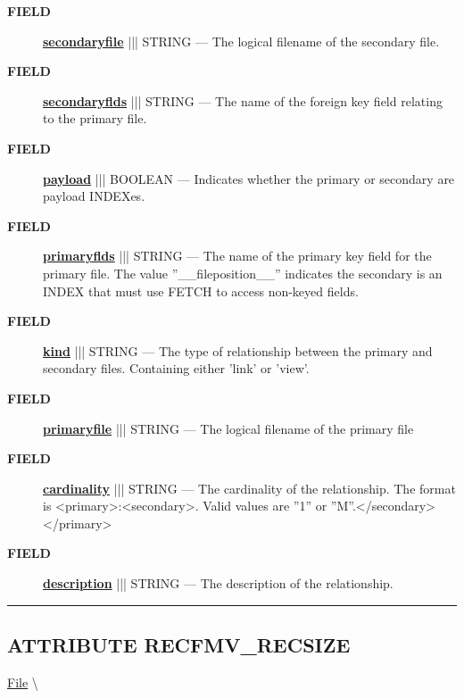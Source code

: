 \par
\begin{description}
\item [\colorbox{tagtype}{\color{white} \textbf{\textsf{FIELD}}}] \textbf{\underline{secondaryfile}} ||| STRING --- The logical filename of the secondary file.
\item [\colorbox{tagtype}{\color{white} \textbf{\textsf{FIELD}}}] \textbf{\underline{secondaryflds}} ||| STRING --- The name of the foreign key field relating to the primary file.
\item [\colorbox{tagtype}{\color{white} \textbf{\textsf{FIELD}}}] \textbf{\underline{payload}} ||| BOOLEAN --- Indicates whether the primary or secondary are payload INDEXes.
\item [\colorbox{tagtype}{\color{white} \textbf{\textsf{FIELD}}}] \textbf{\underline{primaryflds}} ||| STRING --- The name of the primary key field for the primary file. The value ''\_\_fileposition\_\_'' indicates the secondary is an INDEX that must use FETCH to access non-keyed fields.
\item [\colorbox{tagtype}{\color{white} \textbf{\textsf{FIELD}}}] \textbf{\underline{kind}} ||| STRING --- The type of relationship between the primary and secondary files. Containing either 'link' or 'view'.
\item [\colorbox{tagtype}{\color{white} \textbf{\textsf{FIELD}}}] \textbf{\underline{primaryfile}} ||| STRING --- The logical filename of the primary file
\item [\colorbox{tagtype}{\color{white} \textbf{\textsf{FIELD}}}] \textbf{\underline{cardinality}} ||| STRING --- The cardinality of the relationship. The format is <primary>:<secondary>. Valid values are ''1'' or ''M''.</secondary></primary>
\item [\colorbox{tagtype}{\color{white} \textbf{\textsf{FIELD}}}] \textbf{\underline{description}} ||| STRING --- The description of the relationship.
\end{description}





\rule{\linewidth}{0.5pt}
\subsection*{\textsf{\colorbox{headtoc}{\color{white} ATTRIBUTE}
RECFMV\_RECSIZE}}

\hypertarget{ecldoc:file.recfmv_recsize}{}
\hspace{0pt} \hyperlink{ecldoc:File}{File} \textbackslash 

